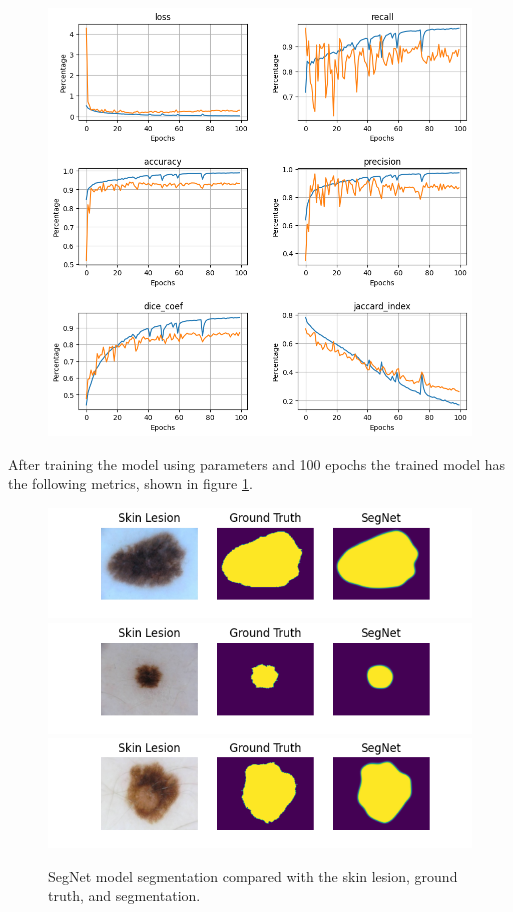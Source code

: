 \begin{figure}[]
    \centering
    \includegraphics[scale=1.0]{images/segmentation/SegNet-results.png}
    \caption{}\label{SegNet-results}
\end{figure}

After training the model using parameters and 100 epochs the trained model has the following metrics, shown in figure \ref{SegNet-results}.



\begin{figure}[]
    \centering
    \includegraphics[scale=0.6]{images/segmentation/SegNet-1.png}
    \includegraphics[scale=0.6]{images/segmentation/SegNet-2.png}
    \includegraphics[scale=0.6]{images/segmentation/SegNet-3.png}
    \caption{SegNet model segmentation compared with the skin lesion, ground truth, and segmentation.}\label{SegNet-examples}
\end{figure}

